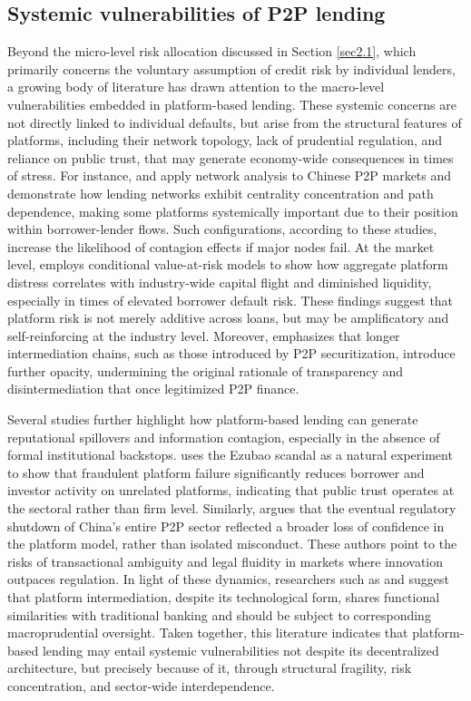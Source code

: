\documentclass[pdflatex,sn-apa]{sn-jnl}%
\theoremstyle{thmstyleone}%
\theoremstyle{thmstyletwo}%
\theoremstyle{thmstylethree}%
\begin{document}
\subsection{Systemic vulnerabilities of P2P lending}
Beyond the micro-level risk allocation discussed in Section \ref{sec2.1}, which primarily concerns the voluntary assumption of credit risk by individual lenders, a growing body of literature has drawn attention to the macro-level vulnerabilities embedded in platform-based lending. These systemic concerns are not directly linked to individual defaults, but arise from the structural features of platforms, including their network topology, lack of prudential regulation, and reliance on public trust, that may generate economy-wide consequences in times of stress. For instance, \citet{Li2018118} and \citet{Lu2018} apply network analysis to Chinese P2P markets and demonstrate how lending networks exhibit centrality concentration and path dependence, making some platforms systemically important due to their position within borrower-lender flows. Such configurations, according to these studies, increase the likelihood of contagion effects if major nodes fail. At the market level, \citet{Li20222596} employs conditional value-at-risk models to show how aggregate platform distress correlates with industry-wide capital flight and diminished liquidity, especially in times of elevated borrower default risk. These findings suggest that platform risk is not merely additive across loans, but may be amplificatory and self-reinforcing at the industry level. Moreover, \citet{Bavoso2020395} emphasizes that longer intermediation chains, such as those introduced by P2P securitization, introduce further opacity, undermining the original rationale of transparency and disintermediation that once legitimized P2P finance. 

Several studies further highlight how platform-based lending can generate reputational spillovers and information contagion, especially in the absence of formal institutional backstops. \citet{Cheng2022} uses the Ezubao scandal as a natural experiment to show that fraudulent platform failure significantly reduces borrower and investor activity on unrelated platforms, indicating that public trust operates at the sectoral rather than firm level. Similarly, \citet{Chen2021} argues that the eventual regulatory shutdown of China’s entire P2P sector reflected a broader loss of confidence in the platform model, rather than isolated misconduct. These authors point to the risks of transactional ambiguity and legal fluidity in markets where innovation outpaces regulation. In light of these dynamics, researchers such as \citet{Wei20161} and \citet{Thakor2020} suggest that platform intermediation, despite its technological form, shares functional similarities with traditional banking and should be subject to corresponding macroprudential oversight. Taken together, this literature indicates that platform-based lending may entail systemic vulnerabilities not despite its decentralized architecture, but precisely because of it, through structural fragility, risk concentration, and sector-wide interdependence.
\end{document}
